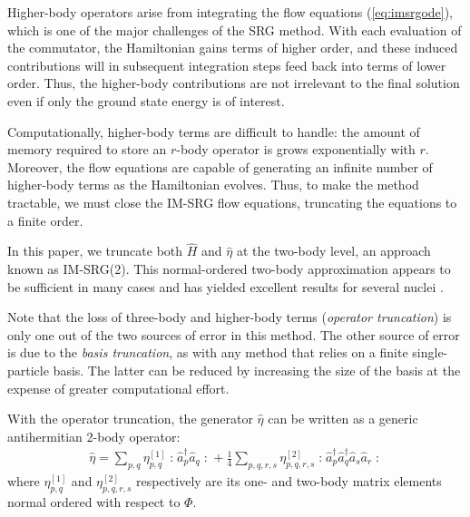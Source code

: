 \documentclass[amsmath, amssymb, aps, floatfix, nofootinbib, preprintnumbers,showpacs, superscriptaddress, twocolumn]{revtex4-1}
\newcommand{\normord}[1]{\mathopen: #1 \mathclose:}
\begin{document}
Higher-body operators arise from integrating the flow equations (\ref{eq:imsrgode}), which is one of the major challenges of the SRG method.  With each evaluation of the commutator, the Hamiltonian gains terms of higher order, and these induced contributions will in subsequent integration steps feed back into terms of lower order.  Thus, the higher-body contributions are not irrelevant to the final solution even if only the ground state energy is of interest.

Computationally, higher-body terms are difficult to handle: the amount of memory required to store an $r$-body operator is grows exponentially with $r$.  Moreover, the flow equations are capable of generating an infinite number of higher-body terms as the Hamiltonian evolves.  Thus, to make the method tractable, we must close the IM-SRG flow equations, truncating the equations to a finite order.

In this paper, we truncate both $\hat{H}$ and $\hat{\eta}$ at the two-body level, an approach known as IM-SRG(2).  This normal-ordered two-body approximation appears to be sufficient in many cases and has yielded excellent results for several nuclei \cite{PhysRevLett.106.222502,PhysRevLett.109.052501,IMSRG}.

Note that the loss of three-body and higher-body terms (\textit{operator truncation}) is only one out of the two sources of error in this method.  The other source of error is due to the \textit{basis truncation}, as with any method that relies on a finite single-particle basis.  The latter can be reduced by increasing the size of the basis at the expense of greater computational effort.

With the operator truncation, the generator $\hat{\eta}$ can be written as a generic antihermitian 2-body operator:
\begin{align*}
\hat{\eta} = \sum_{p, q} \eta_{p, q}^{[1]} \normord{\hat a_p^\dagger \hat a_q} +
\frac{1}{4} \sum_{p, q, r, s}\eta_{p, q, r, s}^{[2]} \normord{\hat a_p^\dagger \hat a_q^\dagger \hat a_s \hat a_r}
\end{align*}
where $\eta_{p, q}^{[1]}$ and $ \eta_{p, q, r, s}^{[2]}$ respectively are its one- and two-body matrix elements normal ordered with respect to $\Phi$.
\end{document}
